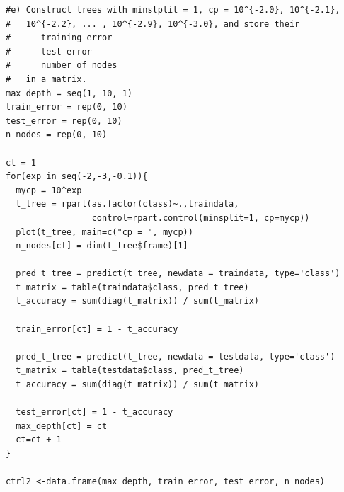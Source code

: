 \documentclass[11pt]{article}
\begin{document}
\begin{Verbatim}
#e) Construct trees with minstplit = 1, cp = 10^{-2.0}, 10^{-2.1}, 
#   10^{-2.2}, ... , 10^{-2.9}, 10^{-3.0}, and store their 
#      training error
#      test error
#      number of nodes
#   in a matrix.
max_depth = seq(1, 10, 1)
train_error = rep(0, 10)
test_error = rep(0, 10)
n_nodes = rep(0, 10)

ct = 1
for(exp in seq(-2,-3,-0.1)){
  mycp = 10^exp  
  t_tree = rpart(as.factor(class)~.,traindata, 
                 control=rpart.control(minsplit=1, cp=mycp))
  plot(t_tree, main=c("cp = ", mycp))
  n_nodes[ct] = dim(t_tree$frame)[1]

  pred_t_tree = predict(t_tree, newdata = traindata, type='class')
  t_matrix = table(traindata$class, pred_t_tree)
  t_accuracy = sum(diag(t_matrix)) / sum(t_matrix)

  train_error[ct] = 1 - t_accuracy

  pred_t_tree = predict(t_tree, newdata = testdata, type='class')
  t_matrix = table(testdata$class, pred_t_tree)
  t_accuracy = sum(diag(t_matrix)) / sum(t_matrix)

  test_error[ct] = 1 - t_accuracy
  max_depth[ct] = ct
  ct=ct + 1
}

ctrl2 <-data.frame(max_depth, train_error, test_error, n_nodes)
\end{Verbatim}
\end{document}
